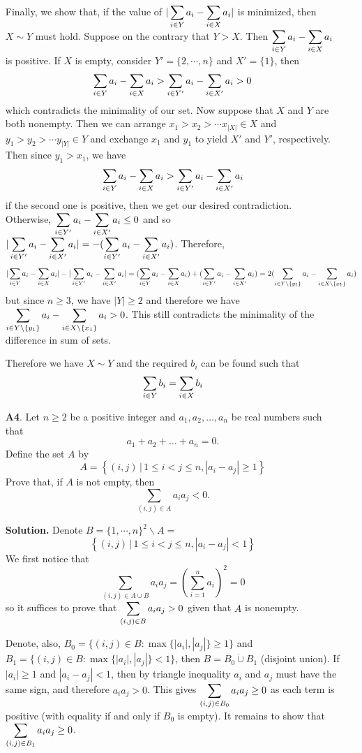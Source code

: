\documentclass[11pt,a4paper]{article}
\begin{document}
\begin{enumerate}
	Finally, we show that, if the value of $|\dsum_{i\in Y}a_i-\dsum_{i\in X}a_i|$ is minimized, then $X\sim Y$ must hold. Suppose on the contrary that $Y>X$. Then $\dsum_{i\in Y}a_i-\dsum_{i\in X}a_i$ is positive. If $X$ is empty, consider $Y'=\{2, \cdots , n\}$ and $X'=\{1\}$, then 
	\[
	\dsum_{i\in Y}a_i-\dsum_{i\in X}a_i>\dsum_{i\in Y'}a_i-\dsum_{i\in X'}a_i>0
	\]
	which contradicts the minimality of our set. Now suppose that $X$ and $Y$ are both nonempty. Then we can arrange $x_1>x_2>\cdots x_|X|\in X$ and $y_1>y_2>\cdots y_|Y|\in Y$ and exchange $x_1$ and $y_1$ to yield $X'$ and $Y'$, respectively. Then since $y_1>x_1$, we have 
	\[
	\dsum_{i\in Y}a_i-\dsum_{i\in X}a_i>\dsum_{i\in Y'}a_i-\dsum_{i\in X'}a_i
	\]
	if the second one is positive, then we get our desired contradiction. Otherwise, $\dsum_{i\in Y'}a_i-\dsum_{i\in X'}a_i\le 0$ and so $|\dsum_{i\in Y'}a_i-\dsum_{i\in X'}a_i|=-(\dsum_{i\in Y'}a_i-\dsum_{i\in X'}a_i)$. Therefore, 
	\[
	|\dsum_{i\in Y}a_i-\dsum_{i\in X}a_i| - |\dsum_{i\in Y'}a_i-\dsum_{i\in X'}a_i|
	= (\dsum_{i\in Y}a_i-\dsum_{i\in X}a_i) + (\dsum_{i\in Y'}a_i-\dsum_{i\in X'}a_i)
	=2(\dsum_{i\in Y\backslash \{y_1\}}a_i-\dsum_{i\in X\backslash\{x_1\}}a_i)
	\]
	but since $n\ge 3$, we have $|Y|\ge 2$ and therefore we have $\dsum_{i\in Y\backslash \{y_1\}}a_i-\dsum_{i\in X\backslash\{x_1\}}a_i>0$. This still contradicts the minimality of the difference in sum of sets. 
	
	Therefore we have $X\sim Y$ and the required $b_i$ can be found such that 
	\[
	\dsum_{i\in Y}b_i = \dsum_{i\in X} b_i
	\]
	
	\item [\textbf{A4}.] Let $n\geqslant 2$ be a positive integer and $a_1,a_2, \ldots ,a_n$ be real numbers such that \[a_1+a_2+\dots+a_n=0.\]Define the set $A$ by
	\[A=\left\{(i, j)\,|\,1 \leqslant i<j \leqslant n,\left|a_{i}-a_{j}\right| \geqslant 1\right\}\]Prove that, if $A$ is not empty, then
	\[\sum_{(i, j) \in A} a_{i} a_{j}<0.\]
	
	\textbf{Solution.} Denote $B=\{1, \cdots , n\}^2\backslash A = $
	\[
	\left\{(i, j)\,|\,1 \leqslant i<j \leqslant n,\left|a_{i}-a_{j}\right| < 1\right\}
	\]
	We first notice that 
	\[
	\sum_{(i, j) \in A\cup B} a_{i} a_{j}
	=(\sum_{i=1}^n a_i)^2
	=0
	\]
	so it suffices to prove that $\displaystyle\sum_{(i, j) \in B} a_{i} a_{j}>0$ given that $A$ is nonempty. 
	
	Denote, also, $B_0=\{(i, j)\in B: \max\{|a_i|, |a_j|\}\ge 1\}$ and $B_1=\{(i, j)\in B: \max\{|a_i|, |a_j|\}< 1\}$, then $B=B_0\dot\cup B_1$ (disjoint union). If $|a_i|\ge 1$ and $|a_i-a_j|<1$, then by triangle inequality $a_i$ and $a_j$ must have the same sign, and therefore $a_ia_j>0$. This gives $\displaystyle\sum_{(i, j) \in B_0} a_{i} a_{j}\ge 0$ as each term is positive (with equality if and only if $B_0$ is empty). It remains to show that $\displaystyle\sum_{(i, j) \in B_1}a_ia_j\ge 0$. 
	

\end{enumerate}
\end{document}
